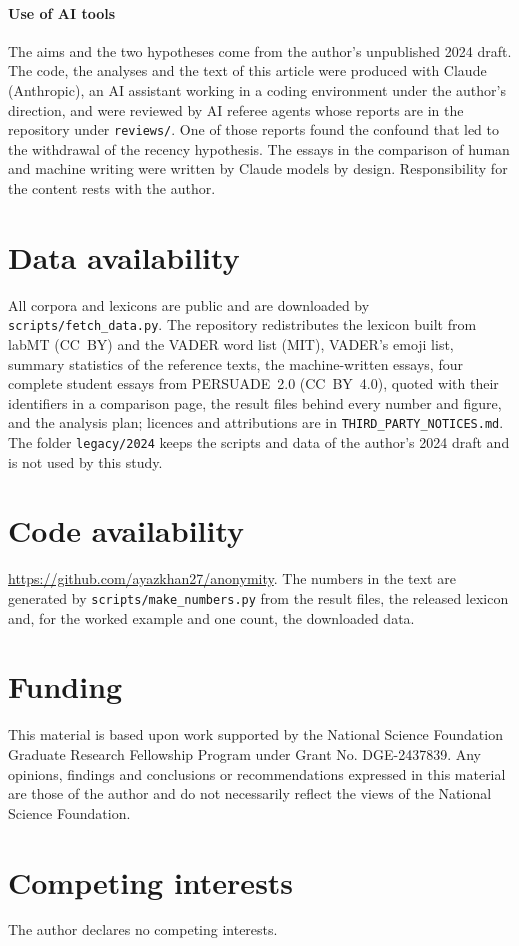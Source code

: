 \paragraph{Use of AI tools}
The aims and the two hypotheses come from the author's unpublished 2024 draft. The code, the analyses and the text of this article were produced with Claude (Anthropic), an AI assistant working in a coding environment under the author's direction, and were reviewed by AI referee agents whose reports are in the repository under \texttt{reviews/}. One of those reports found the confound that led to the withdrawal of the recency hypothesis. The essays in the comparison of human and machine writing were written by Claude models by design. Responsibility for the content rests with the author.

\section{Data availability}
All corpora and lexicons are public and are downloaded by \texttt{scripts/fetch\_data.py}. The repository redistributes the lexicon built from labMT (CC~BY) and the VADER word list (MIT), VADER's emoji list, summary statistics of the reference texts, the machine-written essays, four complete student essays from PERSUADE~2.0 (CC~BY~4.0), quoted with their identifiers in a comparison page, the result files behind every number and figure, and the analysis plan; licences and attributions are in \texttt{THIRD\_PARTY\_NOTICES.md}. The folder \texttt{legacy/2024} keeps the scripts and data of the author's 2024 draft and is not used by this study.

\section{Code availability}
\url{https://github.com/ayazkhan27/anonymity}. The numbers in the text are generated by \texttt{scripts/make\_numbers.py} from the result files, the released lexicon and, for the worked example and one count, the downloaded data.

\section{Funding}
This material is based upon work supported by the National Science Foundation Graduate Research Fellowship Program under Grant No. DGE-2437839. Any opinions, findings and conclusions or recommendations expressed in this material are those of the author and do not necessarily reflect the views of the National Science Foundation.

\section{Competing interests}
The author declares no competing interests.
\normalsize
